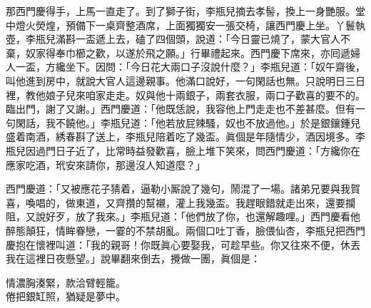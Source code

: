 那西門慶得手，上馬一直走了。到了獅子街，李瓶兒摘去孝髻，換上一身艷服。堂中燈火熒煌，預備下一桌齊整酒席，{}上面獨獨安一張交椅，讓西門慶上坐。丫鬟執壺，李瓶兒滿斟一盃遞上去，磕了四個頭，說道：「今日靈已燒了，蒙大官人不棄，奴家得奉巾櫛之歡，以遂於飛之願。」行畢禮起來。西門慶下席來，亦囘遞婦人一盃，方纔坐下。因問：「今日花大兩口子沒說什麼？」{}李瓶兒道：「奴午齋後，叫他進到房中，就說大官人這邊親事。他滿口說好，一句閑話也無。只說明日三日裡，教他娘子兒來咱家走走。奴與他十兩銀子，兩套衣服，兩口子歡喜的要不的。臨出門，謝了又謝。」西門慶道：「他既恁說，我容他上門走走也不差甚麼。但有一句閑話，我不饒他。」{}李瓶兒道：「他若放屁辣騷，奴也不放過他。」於是銀鑲鍾兒盛着南酒，綉春斟了送上，李瓶兒陪着吃了幾盃。眞個是年隨情少，酒因境多。李瓶兒因過門日子近了，比常時益發歡喜，臉上堆下笑來，問西門慶道：「方纔你在應家吃酒，玳安來請你，那邊沒人知道麼？」

西門慶道：「又被應花子猜着，逼勒小厮說了幾句，鬧混了一場。諸弟兄要與我賀喜，喚唱的，做東道，又齊攢的幫襯，灌上我幾盃。我趕眼錯就走出來，還要攔阻，又說好歹，放了我來。」{}李瓶兒道：「他們放了你，也還解趣哩。」西門慶看他醉態顛狂，情眸眷戀，一霎的不禁胡亂。兩個口吐丁香，臉偎仙杏，李瓶兒把西門慶抱在懷裡叫道：「我的親哥！你既眞心要娶我，可趁早些。{}你又往來不便，休丟我在這裡日夜懸望。」說畢翻來倒去，攪做一團，眞個是：

\begin{myquote}
情濃胸湊緊，款洽臂輕籠。\\倦把銀缸照，猶疑是夢中。
\end{myquote}

 

